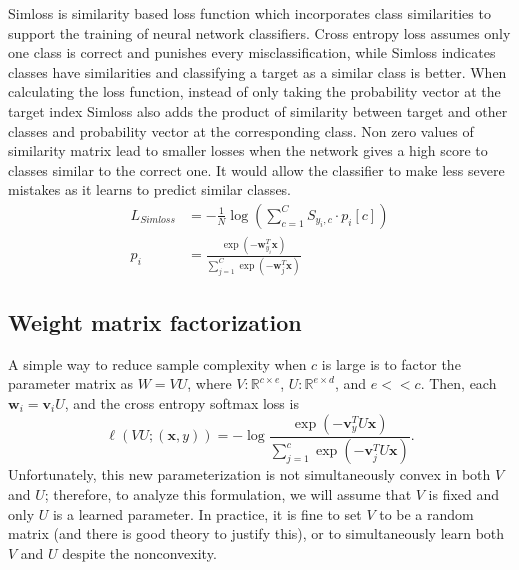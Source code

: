 \documentclass[10pt]{article}
\theoremstyle{definition}
\newcommand{\R}{\mathbb R}
\newcommand{\trans}[1]{{#1}^{T}}
\newcommand{\vv}{\mathbf v}
\newcommand{\w}{\mathbf w}
\newcommand{\x}{\mathbf x}
\begin{document}
Simloss\cite{Kobs2020SimLossCS} is similarity based loss function which incorporates class similarities to support the training of neural network classifiers.
Cross entropy loss assumes only one class is correct and punishes every misclassification, while Simloss indicates classes have similarities and classifying a target as a similar class is better.
When calculating the loss function, instead of only taking the probability vector at the target index Simloss also adds the product of similarity between target and other classes and probability vector at the corresponding class. 
Non zero values of similarity matrix lead to smaller losses when the network gives a high score to classes similar to the correct one. 
It would allow the classifier to make less severe mistakes as it learns to predict similar classes.
\begin{align}
    L_{Simloss}&=-\frac{1}{N}\log(\sum_{c=1}^{C}S_{y_i,c}\cdot p_i[c])\\
    p_i&=\frac {\exp(-\trans\w_{y_i} \x)}{\sum_{j=1}^C \exp(-\trans \w_j \x)}
\end{align}


\subsection{Weight matrix factorization}

A simple way to reduce sample complexity when $c$ is large is to factor the parameter matrix as $W = VU$,
where $V : \R ^ {c \times e}$, $U : \R^{e \times d}$, and $e<\!<\!c$.
Then, each $\w_i = \vv_i U$, and the cross entropy softmax loss is
\begin{equation}
    \ell(VU;(\x,y)) = - \log \frac {\exp(-\trans\vv_y U \x)}{\sum_{j=1}^c \exp(-\trans \vv_j U \x)}
    .
\end{equation}
Unfortunately, this new parameterization is not simultaneously convex in both $V$ and $U$;
therefore, to analyze this formulation, we will assume that $V$ is fixed and only $U$ is a learned parameter.
In practice, it is fine to set $V$ to be a random matrix (and there is good theory to justify this),
or to simultaneously learn both $V$ and $U$ despite the nonconvexity.
\end{document}
